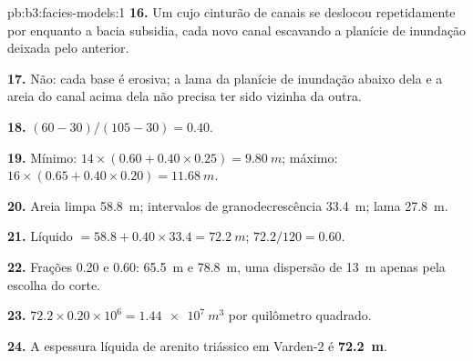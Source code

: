 \begin{solution}{pb:b3:facies-models:1}
\textbf{16.} Um  cujo cinturão de canais se deslocou repetidamente por 
enquanto a bacia subsidia, cada novo canal escavando a planície de inundação
deixada pelo anterior.

\textbf{17.} Não: cada base é erosiva; a lama da planície de inundação abaixo dela e
a areia do canal acima dela não precisa ter sido vizinha da outra.

\textbf{18.} $(60 - 30)/(105 - 30) = 0.40$.

\textbf{19.} Mínimo: $14\times(0.60 + 0.40\times0.25) = \qty{9.80}{m}$;
máximo: $16\times(0.65 + 0.40\times0.20) = \qty{11.68}{m}$.

\textbf{20.} Areia limpa \qty{58.8}{m}; intervalos de granodecrescência \qty{33.4}{m}; lama
\qty{27.8}{m}.

\textbf{21.} Líquido $= 58.8 + 0.40\times33.4 = \qty{72.2}{m}$; 
$72.2/120 = 0.60$.

\textbf{22.} Frações 0.20 e 0.60: \qty{65.5}{m} e \qty{78.8}{m}, uma
dispersão de \qty{13}{m} apenas pela escolha do corte.

\textbf{23.} $72.2\times0.20\times10^6 = \qty{1.44e7}{m^3}$ por
quilômetro quadrado.

\textbf{24.} A espessura líquida de arenito triássico em Varden-2 é
\textbf{\qty[text-series-to-math=true]{72.2}{m}}.
\end{solution}

